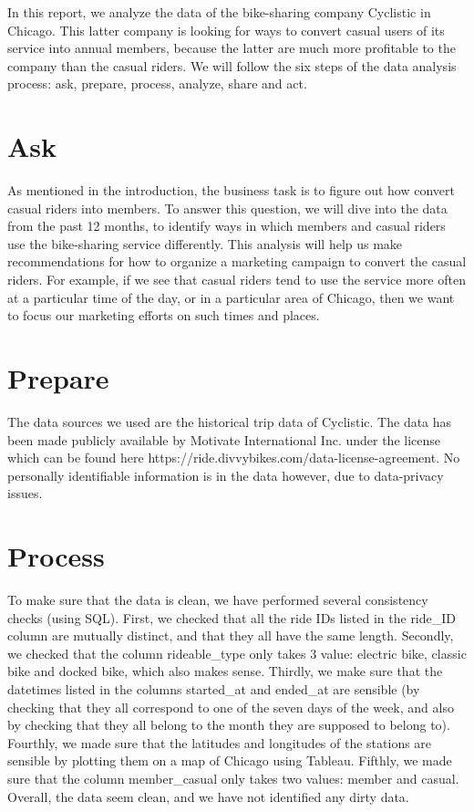 \documentclass[11pt,twoside]{article}
\theoremstyle{plain}
\theoremstyle{definition}
\theoremstyle{remark}
\begin{document}




In this report, we analyze the data of the bike-sharing company Cyclistic in Chicago. This latter company is looking for ways to convert casual users of its service into annual members, because the latter are much more profitable to the company than the casual riders. We will follow the six steps of the data analysis process: ask, prepare, process, analyze, share and act.

\section{Ask}
As mentioned in the introduction, the business task is to figure out how convert casual riders into members. To answer this question, we will dive into the data from the past 12 months, to identify ways in which members and casual riders use the bike-sharing service differently. This analysis will help us make recommendations for how to organize a marketing campaign to convert the casual riders. For example, if we see that casual riders tend to use the service more often at a particular time of the day, or in a particular area of Chicago, then we want to focus our marketing efforts on such times and places.

\section{Prepare}
The data sources we used are the historical trip data of Cyclistic. The data has been made publicly available by Motivate International Inc. under the license which can be found here https://ride.divvybikes.com/data-license-agreement. No personally identifiable information is in the data however, due to data-privacy issues.

\section{Process}
To make sure that the data is clean, we have performed several consistency checks (using SQL). First, we checked that all the ride IDs listed in the ride\_ID column are mutually distinct, and that they all have the same length. Secondly, we checked that the column rideable\_type only takes 3 value: electric bike, classic bike and docked bike, which also makes sense. Thirdly, we make sure that the datetimes listed in the columns started\_at and ended\_at are sensible (by checking that they all correspond to one of the seven days of the week, and also by checking that they all belong to the month they are supposed to belong to). Fourthly, we made sure that the latitudes and longitudes of the stations are sensible by plotting them on a map of Chicago using Tableau. Fifthly, we made sure that the column member\_casual only takes two values: member and casual.\\
Overall, the data seem clean, and we have not identified any dirty data.
\end{document}
